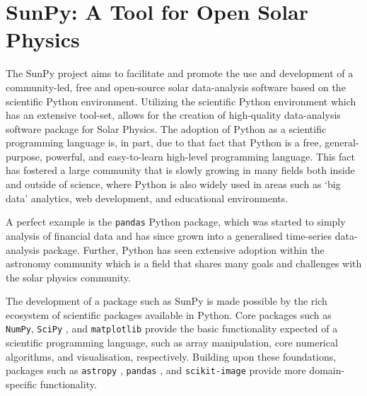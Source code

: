 \documentclass[a4paper,12pt,fourier,authoryear,custommargin]{Classes/PhDThesisPSnPDF}
\begin{document}
%
\clearpage{}%

\chapter{SunPy: A Tool for Open Solar Physics}\label{ch:sunpy}

The SunPy project \citep{thesunpycommunity2015a} aims to facilitate and promote the use and development of a community-led, free and open-source solar data-analysis software based on the scientific Python environment.
Utilizing the scientific Python environment which has an extensive tool-set, allows for the creation of high-quality data-analysis software package for Solar Physics.
The adoption of Python as a scientific programming language is, in part, due to that fact that Python is a free, general-purpose, powerful, and easy-to-learn high-level programming language.
This fact has fostered a large community that is slowly growing in many fields both inside and outside of science, where Python is also widely used in areas such as `big data' analytics, web development, and educational environments.

A perfect example is the \texttt{pandas} \citep{mckinney2010, mckinney2012} Python package, which was started to simply analysis of financial data and has since grown into a generalised time-series data-analysis package.
Further, Python has seen extensive adoption within the astronomy community \citep{greenfield2011} which is a field that shares many goals and challenges with the solar physics community.

The development of a package such as SunPy is made possible by the rich ecosystem of scientific packages available in Python.
Core packages such as \texttt{NumPy}, 
\texttt{SciPy} \citep{jones2001}, and \texttt{matplotlib} \citep{hunter2007} provide the basic functionality expected of a scientific programming language, such as array manipulation, core numerical algorithms, and visualisation, respectively.
Building upon these foundations, packages such as \texttt{astropy} \citep[astronomy;][]{theastropycollaboration2013}, \texttt{pandas} \citep[time-series;][]{mckinney2012}, and \texttt{scikit-image} \citep[image processing;][]{vanderwalt2014} provide more domain-specific functionality.
\end{document}
